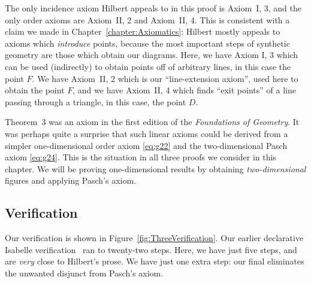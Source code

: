 The only incidence axiom Hilbert appeals to in this proof is Axiom~I, 3, and the only order axioms are Axiom~II, 2 and Axiom~II, 4. This is consistent with a claim we made in Chapter~\ref{chapter:Axiomatics}: Hilbert mostly appeals to axioms which \emph{introduce} points, because the most important steps of synthetic geometry are those which obtain our diagrams. Here, we have Axiom I, 3 which can be used (indirectly) to obtain points off of arbitrary lines, in this case the point $F$. We have Axiom~II, 2 which is our ``line-extension axiom'', used here to obtain the point $F$, and we have Axiom~II, 4 which finds ``exit points'' of a line passing through a triangle, in this case, the point $D$.

Theorem~3 was an axiom in the first edition of the \emph{Foundations of Geometry}. It was perhaps quite a surprise that such linear axioms could be derived from a simpler one-dimensional order axiom \eqref{eq:g22} and the two-dimensional Pasch axiom \eqref{eq:g24}. This is the situation in all three proofs we consider in this chapter. We will be proving one-dimensional results by obtaining \emph{two-dimensional} figures and applying Pasch's axiom.

\subsection{Verification}
Our verification is shown in Figure~\ref{fig:ThreeVerification}. Our earlier declarative Isabelle verification~\cite{ScottMScThesis} ran to twenty-two steps. Here, we have just five steps, and are \emph{very} close to Hilbert's prose. We have just one extra step: our final  eliminates the unwanted disjunct from Pasch's axiom. 

